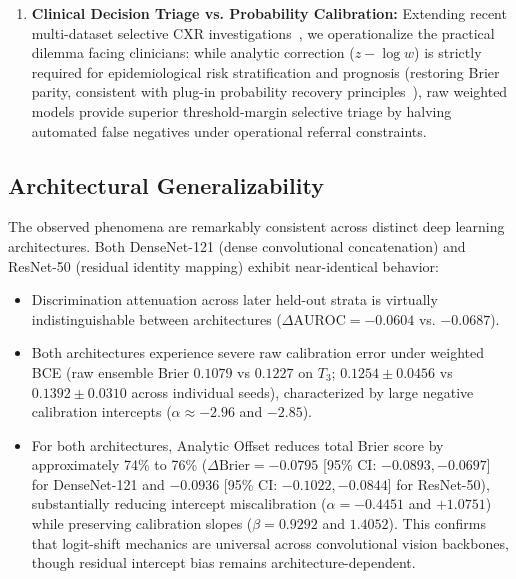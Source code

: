 \documentclass[preprint,12pt]{elsarticle}
\begin{document}
\begin{enumerate}
    \item \textbf{Clinical Decision Triage vs. Probability Calibration:} Extending recent multi-dataset selective CXR investigations~\cite{aperstein2026knowing}, we operationalize the practical dilemma facing clinicians: while analytic correction ($z - \log w$) is strictly required for epidemiological risk stratification and prognosis (restoring Brier parity, consistent with plug-in probability recovery principles~\cite{piccininni2024understanding}), raw weighted models provide superior threshold-margin selective triage by halving automated false negatives under operational referral constraints.
\end{enumerate}

\subsection{Architectural Generalizability}
The observed phenomena are remarkably consistent across distinct deep learning architectures. Both DenseNet-121 (dense convolutional concatenation) and ResNet-50 (residual identity mapping) exhibit near-identical behavior:
\begin{itemize}
    \item Discrimination attenuation across later held-out strata is virtually indistinguishable between architectures ($\Delta\text{AUROC} = -0.0604$ vs. $-0.0687$).
    \item Both architectures experience severe raw calibration error under weighted BCE (raw ensemble Brier $0.1079$ vs $0.1227$ on $T_3$; $0.1254 \pm 0.0456$ vs $0.1392 \pm 0.0310$ across individual seeds), characterized by large negative calibration intercepts ($\alpha \approx -2.96$ and $-2.85$).
    \item For both architectures, Analytic Offset reduces total Brier score by approximately 74\% to 76\% ($\Delta\text{Brier} = -0.0795$ [95\% CI: $-0.0893, -0.0697$] for DenseNet-121 and $-0.0936$ [95\% CI: $-0.1022, -0.0844$] for ResNet-50), substantially reducing intercept miscalibration ($\alpha = -0.4451$ and $+1.0751$) while preserving calibration slopes ($\beta = 0.9292$ and $1.4052$). This confirms that logit-shift mechanics are universal across convolutional vision backbones, though residual intercept bias remains architecture-dependent.
\end{itemize}
\end{document}
